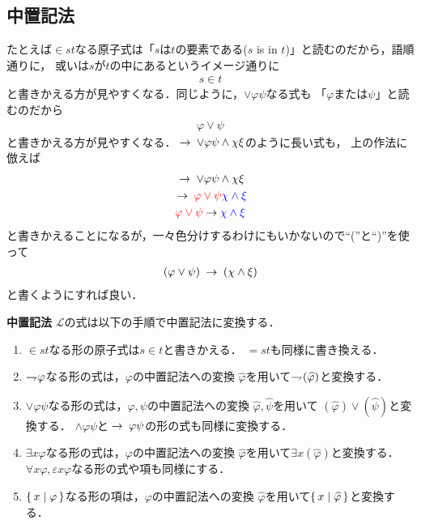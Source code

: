 \subsection{中置記法}
	たとえば$\in s t$なる原子式は「$s$は$t$の要素である($s$ is in $t$)」と読むのだから，語順通りに，
	或いは$s$が$t$の中にあるというイメージ通りに
	\begin{align}
		s \in t
	\end{align}
	と書きかえる方が見やすくなる．同じように，$\vee \varphi \psi$なる式も
	「$\varphi$または$\psi$」と読むのだから
	\begin{align}
		\varphi \vee \psi
	\end{align}
	と書きかえる方が見やすくなる．$\hspace{0.25em}\rightarrow\hspace{0.25em} \vee \varphi \psi \wedge \chi \xi$のように長い式も，
	上の作法に倣えば
	\begin{align}
		\begin{gathered}
			\hspace{0.25em}\rightarrow\hspace{0.25em} \vee \varphi \psi \wedge \chi \xi \\
			\hspace{0.25em}\rightarrow\hspace{0.25em} \color{red}{\varphi \vee \psi} \color{blue}{\chi \wedge \xi} \\
			\color{red}{\varphi \vee \psi} \color{black}{\hspace{0.25em}\rightarrow\hspace{0.25em}} \color{blue}{\chi \wedge \xi}
		\end{gathered}
	\end{align}
	と書きかえることになるが，一々色分けするわけにもいかないので``(''と``)''を使って
	\begin{align}
		(\varphi \vee \psi) \hspace{0.25em}\rightarrow\hspace{0.25em} (\chi \wedge \xi)
	\end{align}
	と書くようにすれば良い．
	
	\begin{itembox}[l]{{\bf 中置記法}}
			$\mathcal{L}$の式は以下の手順で中置記法に変換する．
			\begin{enumerate}
				\item $\in s t$なる形の原子式は$s \in t$と書きかえる．
					$= s t$も同様に書き換える．
					
				\item $\rightharpoondown\hspace{-0.25em} \varphi$なる形の式は，$\varphi$の中置記法への変換
					$\widehat{\varphi}$を用いて$\rightharpoondown\hspace{-0.25em} (\widehat{\varphi})$と変換する．
				
				\item $\vee \varphi \psi$なる形の式は，$\varphi,\psi$の中置記法への変換
					$\widehat{\varphi},\widehat{\psi}$を用いて
					$(\widehat{\varphi}) \vee (\widehat{\psi})$と変換する．
					$\wedge \varphi \psi$と$\hspace{0.25em}\rightarrow\hspace{0.25em} \varphi \psi$の形の式も同様に変換する．
				
				\item $\exists x \varphi$なる形の式は，$\varphi$の中置記法への変換
					$\widehat{\varphi}$を用いて$\exists x (\widehat{\varphi})$と変換する．
					$\forall x \varphi,\varepsilon x \varphi$なる形の式や項も同様にする．
					
				\item $\{\, x \mid \varphi\, \}$なる形の項は，$\varphi$の中置記法への変換
					$\widehat{\varphi}$を用いて$\{\, x \mid \widehat{\varphi}\, \}$と変換する．
			\end{enumerate}
	\end{itembox}
	
